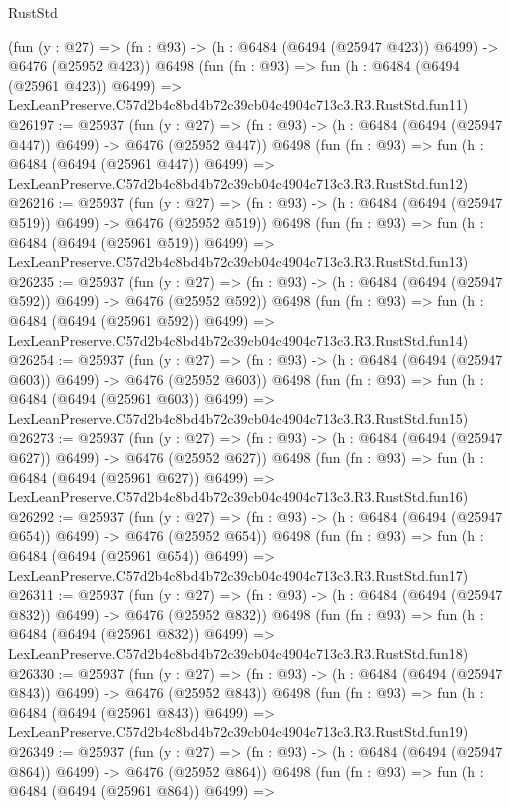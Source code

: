 \begin{lexlean}{RustStd}
\begin{coremodule}
    (fun (y : @27) => (fn : @93) -> (h : @6484 (@6494 (@25947 @423)) @6499) -> @6476 (@25952 @423))
    @6498
    (fun (fn : @93) =>
    fun (h : @6484 (@6494 (@25961 @423)) @6499) =>
    LexLeanPreserve.C57d2b4c8bd4b72c39cb04c4904c713c3.R3.RustStd.fun11)
@26197 := @25937
    (fun (y : @27) => (fn : @93) -> (h : @6484 (@6494 (@25947 @447)) @6499) -> @6476 (@25952 @447))
    @6498
    (fun (fn : @93) =>
    fun (h : @6484 (@6494 (@25961 @447)) @6499) =>
    LexLeanPreserve.C57d2b4c8bd4b72c39cb04c4904c713c3.R3.RustStd.fun12)
@26216 := @25937
    (fun (y : @27) => (fn : @93) -> (h : @6484 (@6494 (@25947 @519)) @6499) -> @6476 (@25952 @519))
    @6498
    (fun (fn : @93) =>
    fun (h : @6484 (@6494 (@25961 @519)) @6499) =>
    LexLeanPreserve.C57d2b4c8bd4b72c39cb04c4904c713c3.R3.RustStd.fun13)
@26235 := @25937
    (fun (y : @27) => (fn : @93) -> (h : @6484 (@6494 (@25947 @592)) @6499) -> @6476 (@25952 @592))
    @6498
    (fun (fn : @93) =>
    fun (h : @6484 (@6494 (@25961 @592)) @6499) =>
    LexLeanPreserve.C57d2b4c8bd4b72c39cb04c4904c713c3.R3.RustStd.fun14)
@26254 := @25937
    (fun (y : @27) => (fn : @93) -> (h : @6484 (@6494 (@25947 @603)) @6499) -> @6476 (@25952 @603))
    @6498
    (fun (fn : @93) =>
    fun (h : @6484 (@6494 (@25961 @603)) @6499) =>
    LexLeanPreserve.C57d2b4c8bd4b72c39cb04c4904c713c3.R3.RustStd.fun15)
@26273 := @25937
    (fun (y : @27) => (fn : @93) -> (h : @6484 (@6494 (@25947 @627)) @6499) -> @6476 (@25952 @627))
    @6498
    (fun (fn : @93) =>
    fun (h : @6484 (@6494 (@25961 @627)) @6499) =>
    LexLeanPreserve.C57d2b4c8bd4b72c39cb04c4904c713c3.R3.RustStd.fun16)
@26292 := @25937
    (fun (y : @27) => (fn : @93) -> (h : @6484 (@6494 (@25947 @654)) @6499) -> @6476 (@25952 @654))
    @6498
    (fun (fn : @93) =>
    fun (h : @6484 (@6494 (@25961 @654)) @6499) =>
    LexLeanPreserve.C57d2b4c8bd4b72c39cb04c4904c713c3.R3.RustStd.fun17)
@26311 := @25937
    (fun (y : @27) => (fn : @93) -> (h : @6484 (@6494 (@25947 @832)) @6499) -> @6476 (@25952 @832))
    @6498
    (fun (fn : @93) =>
    fun (h : @6484 (@6494 (@25961 @832)) @6499) =>
    LexLeanPreserve.C57d2b4c8bd4b72c39cb04c4904c713c3.R3.RustStd.fun18)
@26330 := @25937
    (fun (y : @27) => (fn : @93) -> (h : @6484 (@6494 (@25947 @843)) @6499) -> @6476 (@25952 @843))
    @6498
    (fun (fn : @93) =>
    fun (h : @6484 (@6494 (@25961 @843)) @6499) =>
    LexLeanPreserve.C57d2b4c8bd4b72c39cb04c4904c713c3.R3.RustStd.fun19)
@26349 := @25937
    (fun (y : @27) => (fn : @93) -> (h : @6484 (@6494 (@25947 @864)) @6499) -> @6476 (@25952 @864))
    @6498
    (fun (fn : @93) =>
    fun (h : @6484 (@6494 (@25961 @864)) @6499) =>

\end{coremodule}
\end{lexlean}
